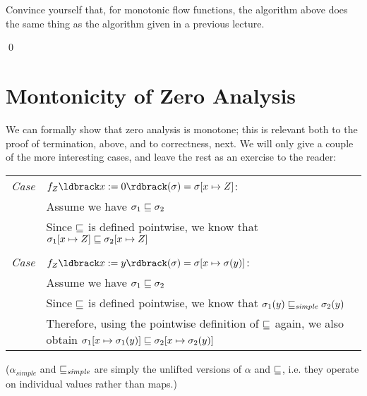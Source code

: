 \documentclass[11pt]{article}
\begin{document}
 Convince yourself that, for monotonic flow functions, the algorithm above does the same thing as the algorithm given in a previous lecture.

\qed

\section{Montonicity of Zero Analysis}


We can formally show that zero analysis is monotone; this is relevant both to the proof of termination, above, and to correctness, next.  We will only give a couple of the more interesting cases, and leave the rest as an exercise to the reader: 

\begin{tabularx}{\textwidth}{lX}
\emph{Case}  & $f_Z\parg{x := 0}(\sigma) = \sigma[x \mapsto Z]$: \\
 & Assume we have $\sigma_1 \sqsubseteq \sigma_2$ \\
 & Since $\sqsubseteq$ is defined pointwise, we know that $\sigma_1[x \mapsto Z] \sqsubseteq \sigma_2[x \mapsto Z]$\\
\\

\emph{Case} &  $f_Z\parg{x := y}(\sigma) = \sigma[x \mapsto \sigma(y)]$: \\
& Assume we have $\sigma_1 \sqsubseteq \sigma_2$ \\
&  Since $\sqsubseteq$ is defined pointwise, we know that $\sigma_1(y) \sqsubseteq_\textit{simple} \sigma_2(y)$ \\
& Therefore, using the pointwise definition of $\sqsubseteq$ again, we also obtain $\sigma_1[x \mapsto \sigma_1(y)] \sqsubseteq \sigma_2[x \mapsto \sigma_2(y)]$\\ 
\end{tabularx}

\noindent ($\alpha_\textit{simple}$ and $\sqsubseteq_\textit{simple}$ are simply the unlifted versions of $\alpha$ and $\sqsubseteq$, i.e. they operate on individual values rather than maps.)
\end{document}
